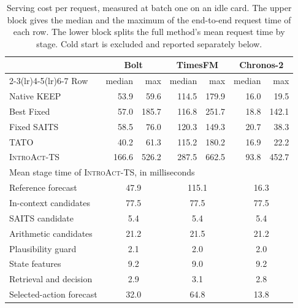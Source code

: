 \documentclass{article}
\newcommand{\introact}{\textsc{IntroAct-TS}}
\begin{document}
\begin{table}[!t]
  \caption{Serving cost per request, measured at batch one on an idle card. The upper block
  gives the median and the maximum of the end-to-end request time of each row. The lower block
  splits the full method's mean request time by stage. Cold start is excluded and reported
  separately below.}
  \label{tab:app-cost}
  \centering
  \small
  \setlength{\tabcolsep}{5pt}
  \begin{tabular*}{\textwidth}{@{\extracolsep{\fill}}lrrrrrr@{}}
    \toprule
    & \multicolumn{2}{c}{Bolt} & \multicolumn{2}{c}{TimesFM} & \multicolumn{2}{c}{Chronos-2} \\
    \cmidrule(lr){2-3}\cmidrule(lr){4-5}\cmidrule(lr){6-7}
    Row & median & max & median & max & median & max \\
    \midrule
    Native KEEP & 53.9 & 59.6 & 114.5 & 179.9 & 16.0 & 19.5 \\
    Best Fixed & 57.0 & 185.7 & 116.8 & 251.7 & 18.8 & 142.1 \\
    Fixed SAITS & 58.5 & 76.0 & 120.3 & 149.3 & 20.7 & 38.3 \\
    TATO & 40.2 & 61.3 & 115.2 & 180.2 & 16.9 & 22.2 \\
    \rowcolor{bestgray}\introact{} & 166.6 & 526.2 & 287.5 & 662.5 & 93.8 & 452.7 \\
    \midrule
    \multicolumn{7}{l}{Mean stage time of \introact{}, in milliseconds} \\
    Reference forecast & \multicolumn{2}{c}{47.9} & \multicolumn{2}{c}{115.1} & \multicolumn{2}{c}{16.3} \\
    In-context candidates & \multicolumn{2}{c}{77.5} & \multicolumn{2}{c}{77.5} & \multicolumn{2}{c}{77.5} \\
    SAITS candidate & \multicolumn{2}{c}{5.4} & \multicolumn{2}{c}{5.4} & \multicolumn{2}{c}{5.4} \\
    Arithmetic candidates & \multicolumn{2}{c}{21.2} & \multicolumn{2}{c}{21.5} & \multicolumn{2}{c}{21.2} \\
    Plausibility guard & \multicolumn{2}{c}{2.1} & \multicolumn{2}{c}{2.0} & \multicolumn{2}{c}{2.0} \\
    State features & \multicolumn{2}{c}{9.2} & \multicolumn{2}{c}{9.0} & \multicolumn{2}{c}{9.2} \\
    Retrieval and decision & \multicolumn{2}{c}{2.9} & \multicolumn{2}{c}{3.1} & \multicolumn{2}{c}{2.8} \\
    Selected-action forecast & \multicolumn{2}{c}{32.0} & \multicolumn{2}{c}{64.8} & \multicolumn{2}{c}{13.8} \\
    \bottomrule
  \end{tabular*}
\end{table}
\end{document}
